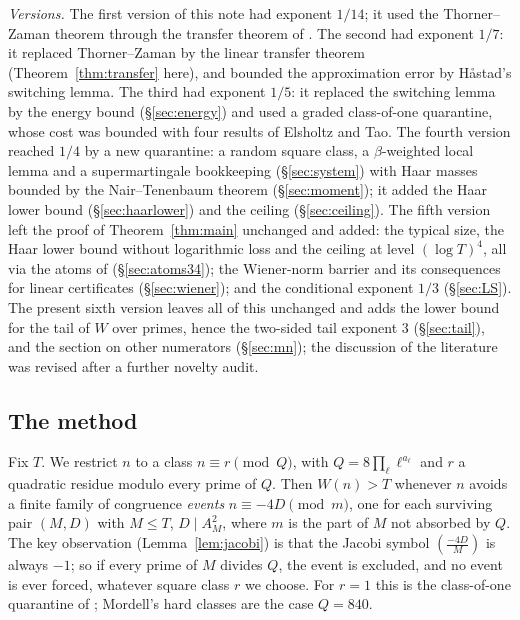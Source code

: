 \documentclass[11pt,reqno]{amsart}
\theoremstyle{definition}
\begin{document}
\emph{Versions.}  The first version of this note had exponent $1/14$; it used
the Thorner--Zaman theorem \cite{TZ} through the transfer theorem of
\cite{Paper1}.  The second had exponent $1/7$: it replaced Thorner--Zaman by
the linear transfer theorem (Theorem~\ref{thm:transfer} here), and bounded
the approximation error by Håstad's switching lemma.  The third had exponent
$1/5$: it replaced the switching lemma by the energy bound
(\S\ref{sec:energy}) and used a graded class-of-one quarantine, whose cost
was bounded with four results of Elsholtz and Tao.  The fourth version
reached $1/4$ by a new quarantine: a random square class, a $\beta$-weighted
local lemma and a supermartingale bookkeeping (\S\ref{sec:system}) with Haar
masses bounded by the Nair--Tenenbaum theorem (\S\ref{sec:moment}); it added
the Haar lower bound (\S\ref{sec:haarlower}) and the ceiling
(\S\ref{sec:ceiling}).  The fifth version left the proof of
Theorem~\ref{thm:main} unchanged and added: the typical size, the Haar lower
bound without logarithmic loss and the ceiling at level $(\log T)^4$, all via
the atoms of \cite{TQ} (\S\ref{sec:atoms34}); the Wiener-norm barrier and its
consequences for linear certificates (\S\ref{sec:wiener}); and the
conditional exponent $1/3$ (\S\ref{sec:LS}).  The present sixth version
leaves all of this unchanged and adds the lower bound for the tail of $W$
over primes, hence the two-sided tail exponent $3$ (\S\ref{sec:tail}), and
the section on other numerators (\S\ref{sec:mn}); the discussion of the
literature was revised after a further novelty audit.

\subsection*{The method}
Fix $T$.  We restrict $n$ to a class $n\equiv r\pmod Q$, with
$Q=8\prod_\ell\ell^{a_\ell}$ and $r$ a quadratic residue modulo every prime of $Q$.
Then $W(n)>T$ whenever $n$ avoids a finite family of congruence \emph{events}
$n\equiv-4D\pmod{m}$, one for each surviving pair $(M,D)$ with $M\le T$,
$D\mid A_M^2$, where $m$ is the part of $M$ not absorbed by $Q$.  The key
observation (Lemma~\ref{lem:jacobi}) is that the Jacobi symbol
$(\frac{-4D}M)$ is always $-1$; so if every prime of $M$ divides $Q$, the
event is excluded, and no event is ever forced, whatever square class $r$
we choose.  For $r=1$ this is the class-of-one quarantine of \cite{Paper1};
Mordell's hard classes are the case $Q=840$.
\end{document}
